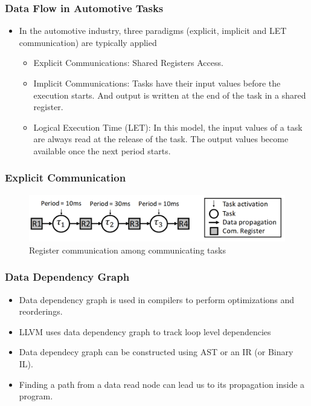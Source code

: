 \documentclass{beamer}
\begin{document}
\begin{frame}
    \frametitle{Data Flow in Automotive Tasks}
    \begin{itemize}
        \item In the automotive industry, three paradigms (explicit, implicit
            and LET communication) are typically applied
            \begin{itemize}
                \item Explicit Communications: Shared Registers Access.
                \item Implicit Communications: Tasks have their input values
                    before the execution starts. And output is written at
                    the end of the task in a shared register.
                \item Logical Execution Time (LET): In this model,
                    the input values of a task are always read at the release
                    of the task. The output values become available once the
                    next period starts. 
            \end{itemize}
    \end{itemize}
\end{frame}
\begin{frame}
    \frametitle{Explicit Communication}
    \begin{figure}
        \centering
        \includegraphics[width=1.0\columnwidth]{task.png}
        \caption{Register communication among communicating tasks}
        \label{fig:task}
    \end{figure}
\end{frame}
\begin{frame}
    \frametitle{Data Dependency Graph}
    \begin{itemize}
        \item Data dependency graph is used in compilers to perform
            optimizations and reorderings.
        \item LLVM uses data dependency graph to track loop level dependencies
        \item Data dependecy graph can be constructed using AST or an IR (or Binary IL).
        \item Finding a path from a data read node can lead us to its
            propagation inside a program.
    \end{itemize}
\end{frame}
\end{document}
